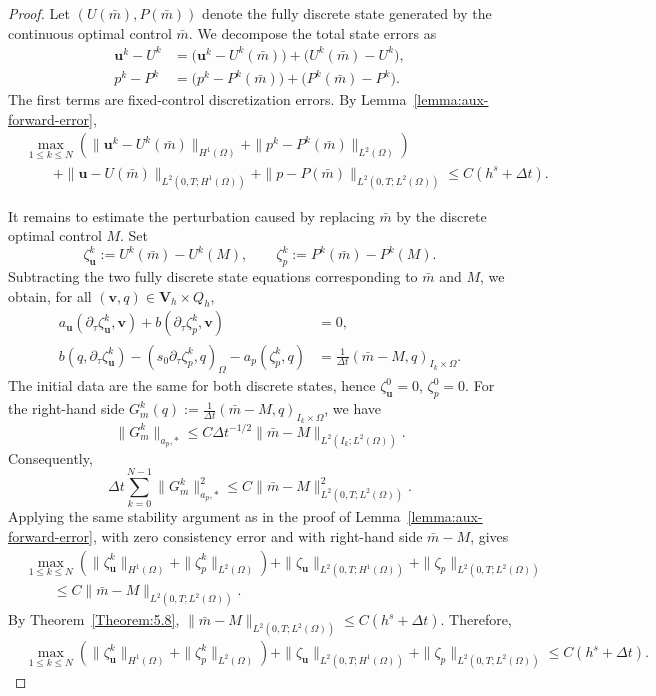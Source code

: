 \documentclass[10pt,a4paper]{amsart}
\begin{document}
\begin{proof}
Let $(U(\bar m),P(\bar m))$ denote the fully discrete state generated by
the continuous optimal control $\bar m$. We decompose the total state
errors as
\begin{align*}
\boldsymbol u^k-U^k
&=
\bigl(\boldsymbol u^k-U^k(\bar m)\bigr)
+
\bigl(U^k(\bar m)-U^k\bigr),
\\
p^k-P^k
&=
\bigl(p^k-P^k(\bar m)\bigr)
+
\bigl(P^k(\bar m)-P^k\bigr).
\end{align*}
The first terms are fixed-control discretization errors. By
Lemma~\ref{lemma:aux-forward-error},
\[
\begin{aligned}
&\max_{1\le k\le N}
\left(
\|\boldsymbol u^k-U^k(\bar m)\|_{H^1(\Omega)}
+
\|p^k-P^k(\bar m)\|_{L^2(\Omega)}
\right)
\\
&\qquad
+
\|\boldsymbol u-U(\bar m)\|_{L^2(0,T;H^1(\Omega))}
+
\|p-P(\bar m)\|_{L^2(0,T;L^2(\Omega))}
\le
C(h^s+\Delta t).
\end{aligned}
\]

It remains to estimate the perturbation caused by replacing $\bar m$ by
the discrete optimal control $M$. Set
\[
\zeta_{\boldsymbol u}^k:=U^k(\bar m)-U^k(M),
\qquad
\zeta_p^k:=P^k(\bar m)-P^k(M).
\]
Subtracting the two fully discrete state equations corresponding to
$\bar m$ and $M$, we obtain, for all
$(\boldsymbol v,q)\in \boldsymbol V_h\times Q_h$,
\begin{align}
a_{\boldsymbol u}(\partial_\tau\zeta_{\boldsymbol u}^k,\boldsymbol v)
+
b(\partial_\tau\zeta_p^k,\boldsymbol v)
&=0,
\\
b(q,\partial_\tau\zeta_{\boldsymbol u}^k)
-
(s_0\partial_\tau\zeta_p^k,q)_\Omega
-
a_p(\zeta_p^k,q)
&=
\frac1{\Delta t}
(\bar m-M,q)_{I_k\times\Omega}.
\end{align}
The initial data are the same for both discrete states, hence
$\zeta_{\boldsymbol u}^0=0$, $\zeta_p^0=0$.
For the right-hand side $G_m^k(q):=\frac1{\Delta t}(\bar m-M,q)_{I_k\times\Omega}$,
we have
\[
\|G_m^k\|_{a_p,*}
\le
C\Delta t^{-1/2}
\|\bar m-M\|_{L^2(I_k;L^2(\Omega))}.
\]
Consequently,
\[
\Delta t\sum_{k=0}^{N-1}\|G_m^k\|_{a_p,*}^2
\le
C\|\bar m-M\|_{L^2(0,T;L^2(\Omega))}^2.
\]
Applying the same stability argument as in the proof of
Lemma~\ref{lemma:aux-forward-error}, with zero consistency error and
with right-hand side $\bar m-M$, gives
\[
\begin{aligned}
&\max_{1\le k\le N}
\left(
\|\zeta_{\boldsymbol u}^k\|_{H^1(\Omega)}
+
\|\zeta_p^k\|_{L^2(\Omega)}
\right)
+
\|\zeta_{\boldsymbol u}\|_{L^2(0,T;H^1(\Omega))}
+
\|\zeta_p\|_{L^2(0,T;L^2(\Omega))}
\\
&\qquad
\le
C
\|\bar m-M\|_{L^2(0,T;L^2(\Omega))}.
\end{aligned}
\]
By Theorem~\ref{Theorem:5.8}, $\|\bar m-M\|_{L^2(0,T;L^2(\Omega))} \le C(h^s+\Delta t)$. 
Therefore,
\[
\begin{aligned}
&\max_{1\le k\le N}
\left(
\|\zeta_{\boldsymbol u}^k\|_{H^1(\Omega)}
+
\|\zeta_p^k\|_{L^2(\Omega)}
\right)
+
\|\zeta_{\boldsymbol u}\|_{L^2(0,T;H^1(\Omega))}
+
\|\zeta_p\|_{L^2(0,T;L^2(\Omega))}
\le
C(h^s+\Delta t).
\end{aligned}
\]


\end{proof}
\end{document}
